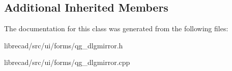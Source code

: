 \subsection*{Additional Inherited Members}


The documentation for this class was generated from the following files\-:\begin{DoxyCompactItemize}
\item 
librecad/src/ui/forms/qg\-\_\-dlgmirror.\-h\item 
librecad/src/ui/forms/qg\-\_\-dlgmirror.\-cpp\end{DoxyCompactItemize}
